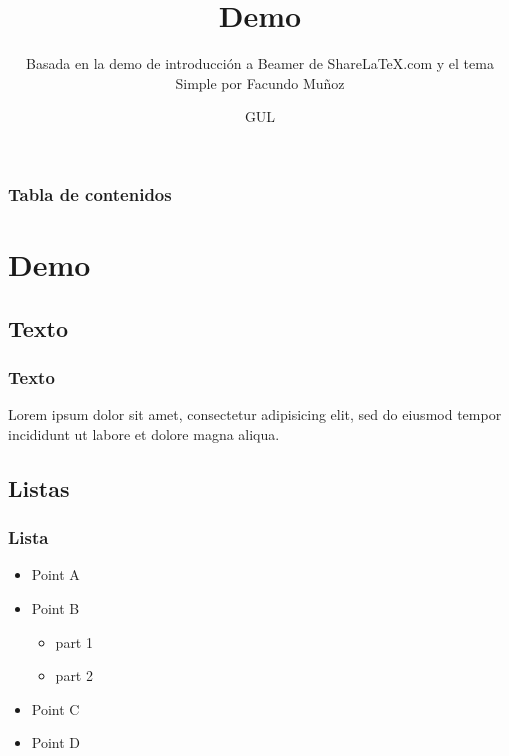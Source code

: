 \documentclass[aspectratio=43]{beamer}
\title{Demo} %
\subtitle{Basada en la demo de introducción a Beamer de ShareLaTeX.com y el tema Simple por Facundo Muñoz} %
\author{GUL} %
\institute{\edicion \ Jornadas Técnicas del GUL}
\date{\fecha}
\begin{document}
{
    \begin{frame}
        \titlepage
    \end{frame}
}
\addtocounter{framenumber}{-1}



\begin{frame}
    \frametitle{Tabla de contenidos} %
    \tableofcontents
\end{frame}

\section{Demo}

\subsection{Texto}

\begin{frame}
    \frametitle{Texto}
    Lorem ipsum dolor sit amet, consectetur adipisicing elit, sed do eiusmod tempor incididunt ut labore et dolore magna aliqua.
\end{frame}

\subsection{Listas}

\begin{frame}
    \frametitle{Lista}
    \begin{itemize}
    \item Point A
    \item Point B
    \begin{itemize}
        \item part 1
        \item part 2
    \end{itemize}
    \item Point C
    \item Point D
    \end{itemize}
\end{frame}
\end{document}
